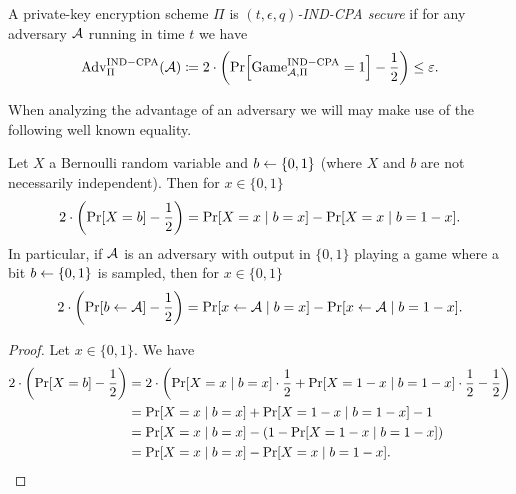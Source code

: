 \begin{definition}
	A private-key encryption scheme $\Pi$ is \emph{$(t, \epsilon, q)$-IND-CPA secure} if for any adversary $\mathcal{A}$ running in time $t$ we have
	\begin{align*}
		\mathrm{Adv}_{\Pi}^{\mathrm{IND-CPA}}(\adv) \coloneqq 2 \cdot \left(\pr{\mathrm{Game}_{\adv, \Pi}^{\mathrm{IND-CPA}} = 1} - \frac{1}{2}\right) \le \epsilon.
	\end{align*}
\end{definition}

When analyzing the advantage of an adversary we will may make use of the following well known equality.

\begin{lemma}
	Let $X$ a Bernoulli random variable and $b \leftarrow \{0, 1\}$ (where $X$ and $b$ are not necessarily independent). Then for $x \in \{0, 1\}$
	\[
		2 \cdot \left(\pr{X = b} - \frac{1}{2}\right) = \pr{X = x \mid b = x} - \pr{X = x \mid b = 1 - x}.
	\]
	In particular, if $\mathcal{A}$ is an adversary with output in $\{0, 1\}$ playing a game where a bit $b \leftarrow \{0, 1\}$ is sampled, then for $x \in \{0, 1\}$
	\begin{equation} \label{eq:advantage-equality}
		2 \cdot \left(\pr{b \from \adv} - \frac{1}{2}\right) = \pr{x \from \adv \mid b = x} - \pr{x \from \adv \mid b = 1 - x}.
	\end{equation}
\end{lemma}
\begin{proof}
	Let $x \in \{0, 1\}$. We have
	\begin{align*}
		2 \cdot \left(\pr{X = b} - \frac{1}{2}\right) & = 2 \cdot \left(\pr{X = x \mid b = x} \cdot \frac{1}{2} + \pr{X = 1 - x \mid b = 1 - x} \cdot \frac{1}{2} - \frac{1}{2}\right) \\
		                                              & = \pr{X = x \mid b = x} + \pr{X = 1 - x \mid b = 1 - x} - 1                                                                    \\
		                                              & = \pr{X = x \mid b = x} - (1 - \pr{X = 1 - x \mid b = 1 - x})                                                                  \\
		                                              & = \pr{X = x \mid b = x} - \pr{X = x \mid b = 1 - x}.
	\end{align*}
\end{proof}


